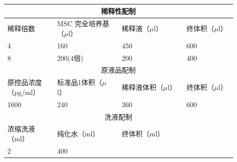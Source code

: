\documentclass[UTF8,10pt,a4paper,fontset=fandol]{ctexart}
\newcommand{\fieldvalue}[1]{#1}
\newcommand{\handwritten}[1]{#1}
\begin{document}
\begin{center}
\begin{tabular}{|p{0.20\linewidth}|p{0.26\linewidth}|p{0.26\linewidth}|p{0.20\linewidth}|}
\hline
\multicolumn{4}{|c|}{稀释性配制} \\ \hline
稀释倍数 & MSC 完全培养基（$\mu$l） & 稀释液（$\mu$l） & 终体积（$\mu$l） \\ \hline
\fieldvalue{\handwritten{4}} &
\fieldvalue{\handwritten{160}} &
\fieldvalue{\handwritten{450}} &
\fieldvalue{\handwritten{600}} \\ \hline
\fieldvalue{\handwritten{8}} &
\fieldvalue{\handwritten{200(4倍)}} &
\fieldvalue{\handwritten{200}} &
\fieldvalue{\handwritten{400}} \\ \hline
\multicolumn{4}{|c|}{原液品配制} \\ \hline
原控品浓度（pg/ml） & 标准品1体积（$\mu$l） & 稀释液体积（$\mu$l） & 终体积（$\mu$l） \\ \hline
\fieldvalue{\handwritten{1600}} &
\fieldvalue{\handwritten{240}} &
\fieldvalue{\handwritten{360}} &
\fieldvalue{\handwritten{600}} \\ \hline
\multicolumn{4}{|c|}{洗液配制} \\ \hline
浓缩洗液（ml） & 纯化水（ml） & 终体积（ml） & \\ \hline
\fieldvalue{\handwritten{2}} &
\fieldvalue{\handwritten{400}} &

\end{tabular}
\end{center}
\end{document}
